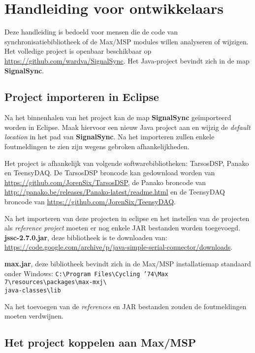 \chapter{Handleiding voor ontwikkelaars}
\label{appendix-e}

Deze handleiding is bedoeld voor mensen die de code van synchronisatiebibliotheek of de Max/MSP modules willen analyseren of wijzigen. Het volledige project is openbaar beschikbaar op \url{https://github.com/wardva/SignalSync}. Het Java-project bevindt zich in de map \textbf{SignalSync}.

\section*{Project importeren in Eclipse}

Na het binnenhalen van het project kan de map \textbf{SignalSync} geïmporteerd worden in Eclipse. Maak hiervoor een nieuw Java project aan en wijzig de \textit{default location} in het pad van \textbf{SignalSync}. Na het importeren zullen enkele foutmeldingen te zien zijn wegens gebroken afhankelijkheden. 

Het project is afhankelijk van volgende softwarebibliotheken: TarsosDSP, Panako en TeensyDAQ. De TarsosDSP broncode kan gedownload worden van \url{https://github.com/JorenSix/TarsosDSP}, de Panako broncode van \url{http://panako.be/releases/Panako-latest/readme.html} en de TeensyDAQ broncode van \url{https://github.com/JorenSix/TeensyDAQ}. 

Na het importeren van deze projecten in eclipse en het instellen van de projecten als \textit{reference project} moeten er nog enkele JAR bestanden worden toegevoegd. 
\newpage
\textbf{jssc-2.7.0.jar}, deze bibliotheek is te downloaden van: \url{https://code.google.com/archive/p/java-simple-serial-connector/downloads}.

\textbf{max.jar}, deze bibliotheek bevindt zich in de Max/MSP installatiemap standaard onder Windows: \texttt{C:\textbackslash Program Files\textbackslash Cycling '74\textbackslash Max 7\textbackslash resources\textbackslash packages\textbackslash max-mxj\textbackslash \\ java-classes\textbackslash lib}

Na het toevoegen van de \textit{references} en JAR bestanden zouden de foutmeldingen moeten verdwijnen.

\section*{Het project koppelen aan Max/MSP}

